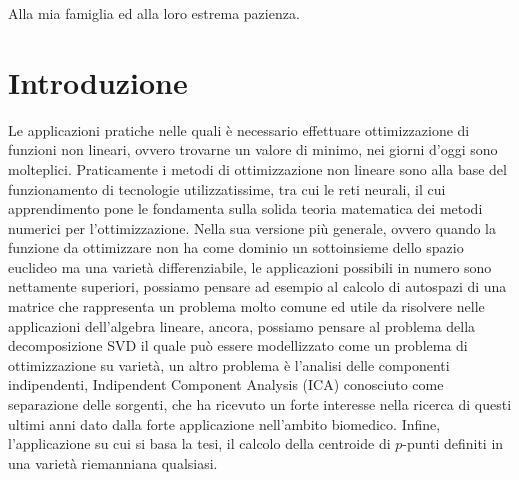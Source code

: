 \documentclass[a4paper, 12pt]{article}
\begin{document}
\clearpage
\begin{center}
    \thispagestyle{empty}
    \vspace*{\fill}
    Alla mia famiglia ed alla loro estrema pazienza.
    \vspace*{\fill}
\end{center}
\clearpage


\newpage

\renewcommand{\contentsname}{Contenuti}
\tableofcontents

\newpage

\section{Introduzione}
Le applicazioni pratiche nelle quali è necessario effettuare ottimizzazione di funzioni non lineari, ovvero trovarne un valore di minimo, nei giorni d'oggi sono molteplici. Praticamente i metodi di ottimizzazione non lineare sono alla base del funzionamento di tecnologie utilizzatissime, tra cui le reti neurali, il cui apprendimento pone le fondamenta sulla solida teoria matematica dei metodi numerici per l'ottimizzazione. Nella sua versione più generale, ovvero quando la funzione da ottimizzare non ha come dominio un sottoinsieme dello spazio euclideo ma una varietà differenziabile, le applicazioni possibili in numero sono nettamente superiori, possiamo pensare ad esempio al calcolo di autospazi di una matrice che rappresenta un problema molto comune ed utile da risolvere nelle applicazioni dell'algebra lineare, ancora, possiamo pensare al problema della decomposizione SVD il quale può essere modellizzato come un problema di ottimizzazione su varietà, un altro problema è l'analisi delle componenti indipendenti, Indipendent Component Analysis (ICA) conosciuto come separazione delle sorgenti, che ha ricevuto un forte interesse nella ricerca di questi ultimi anni dato dalla forte applicazione nell'ambito biomedico. Infine, l'applicazione su cui si basa la tesi, il calcolo della centroide di $p$-punti definiti in una varietà riemanniana qualsiasi.\\
\end{document}
